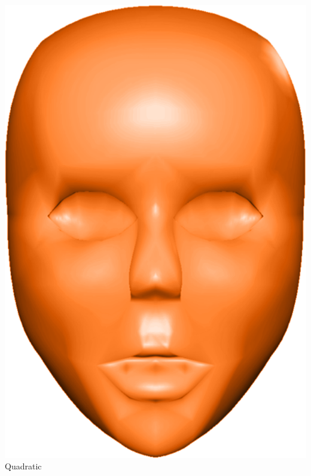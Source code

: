 \begin{frame}
\begin{columns}
\begin{column}{0.4\textwidth}
\begin{center}
					\includegraphics[width=\textwidth]{img/1_single/quadriticallyVaryingNormals.png}
					\small{Quadratic}
				\end{center}	
			\end{column}
		\end{columns}
	\end{frame}


